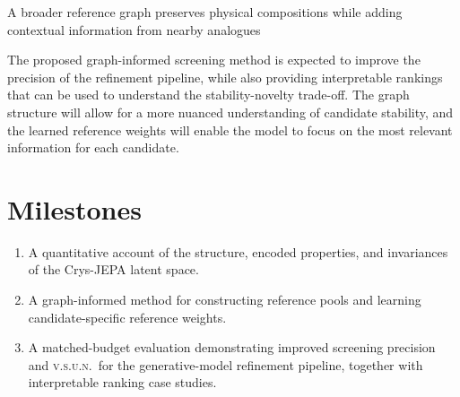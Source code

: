 \documentclass[10pt,a4paper]{article}
\newcommand{\vsun}{\textsc{v.s.u.n.}}
\newcommand{\sectionrule}{\vspace{-1.5pt}{\color{navy!35}\hrule height .35pt}\vspace{1.2pt}}
\begin{document}
\begin{minipage}[t]{0.32\textwidth}
\vspace{6pt}
\centering
{}%
\vspace{1pt}

{\scriptsize A broader reference graph preserves physical compositions while adding contextual information from nearby analogues}
\end{minipage}

\medskip
The proposed graph-informed screening method is expected to improve the precision of the refinement pipeline, while also providing interpretable rankings that can be used to understand the stability-novelty trade-off. The graph structure will allow for a more nuanced understanding of candidate stability, and the learned reference weights will enable the model to focus on the most relevant information for each candidate.

\section*{Milestones}
\sectionrule
\begin{enumerate}[label=\textbf{\arabic*.}]
  \item A quantitative account of the structure, encoded properties, and invariances of the Crys-JEPA latent space.
  \item A graph-informed method for constructing reference pools and learning candidate-specific reference weights.
  \item A matched-budget evaluation demonstrating improved screening precision and \vsun\ for the generative-model refinement pipeline, together with interpretable ranking case studies.
\end{enumerate}
\end{document}
